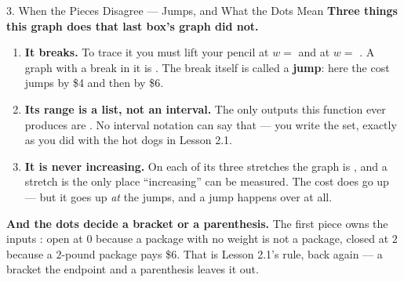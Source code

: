 \documentclass[10pt]{article}
\begin{document}
\begin{notesbox}{3. When the Pieces Disagree --- Jumps, and What the Dots Mean}
\vspace{6pt}
\textbf{Three things this graph does that last box's graph did not.}
\begin{enumerate}[leftmargin=1.5em, itemsep=3pt, topsep=3pt]
  \item \textbf{It breaks.} To trace it you must lift your pencil at $w=$ \blank{1.0cm} and at $w=$
        \blank{1.0cm}. A graph with a break in it is \blank{2.8cm}. The break itself is called a
        \textbf{jump}: here the cost jumps by \$4 and then by \$6.
  \item \textbf{Its range is a list, not an interval.} The only outputs this function ever produces
        are \blank{4.0cm}. No interval notation can say that --- you write the set, exactly as you did
        with the hot dogs in Lesson 2.1.
  \item \textbf{It is never increasing.} On each of its three stretches the graph is
        \blank{2.2cm}, and a stretch is the only place ``increasing'' can be measured. The cost does
        go up --- but it goes up \emph{at} the jumps, and a jump happens over \blank{2.6cm} at all.
\end{enumerate}

\vspace{4pt}
\textbf{And the dots decide a bracket or a parenthesis.} The first piece owns the inputs
\blank{3.0cm}: open at $0$ because a package with no weight is not a package, closed at $2$ because a
$2$-pound package pays \$6. That is Lesson 2.1's rule, back again --- a bracket \blank{2.0cm} the
endpoint and a parenthesis leaves it out.
\end{notesbox}

\vspace{0.10in}
\end{document}
